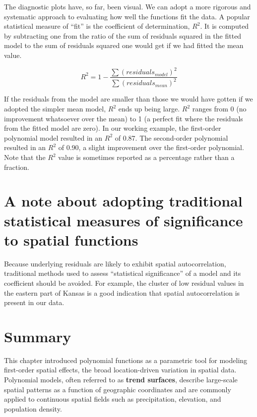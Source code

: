 \documentclass[
  letterpaper,
]{book}
\begin{document}
The diagnostic plots have, so far, been visual. We can adopt a more
rigorous and systematic approach to evaluating how well the functions
fit the data. A popular statistical measure of ``fit'' is the
coefficient of determination, \(R^2\). It is computed by subtracting one
from the ratio of the sum of residuals squared in the fitted model to
the sum of residuals squared one would get if we had fitted the mean
value.

\begin{equation}
\tag{11}
R^2 = 1 - \frac{\sum(residuals_{model})^2}{\sum(residuals_{mean})^2}
\end{equation}

If the residuals from the model are smaller than those we would have
gotten if we adopted the simpler mean model, \(R^2\) ends up being
large. \(R^2\) ranges from 0 (no improvement whatsoever over the mean)
to 1 (a perfect fit where the residuals from the fitted model are zero).
In our working example, the first-order polynomial model resulted in an
\(R^2\) of 0.87. The second-order polynomial resulted in an \(R^2\) of
0.90, a slight improvement over the first-order polynomial. Note that
the \(R^2\) value is sometimes reported as a percentage rather than a
fraction.

\section{A note about adopting traditional statistical measures of
significance to spatial
functions}\label{a-note-about-adopting-traditional-statistical-measures-of-significance-to-spatial-functions}

Because underlying residuals are likely to exhibit spatial
autocorrelation, traditional methods used to assess ``statistical
significance'' of a model and its coefficient should be avoided. For
example, the cluster of low residual values in the eastern part of
Kansas is a good indication that spatial autocorrelation is present in
our data.

\section{Summary}\label{summary-10}

This chapter introduced polynomial functions as a parametric tool for
modeling first-order spatial effects, the broad location-driven
variation in spatial data. Polynomial models, often referred to as
\textbf{trend surfaces}, describe large-scale spatial patterns as a
function of geographic coordinates and are commonly applied to
continuous spatial fields such as precipitation, elevation, and
population density.
\end{document}
